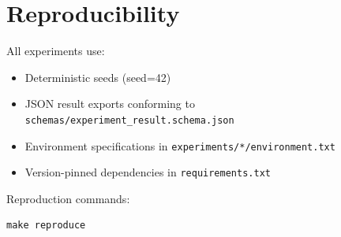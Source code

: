 \section{Reproducibility}
\label{app:reproducibility}


All experiments use:
\begin{itemize}
\item Deterministic seeds (seed=42)
\item JSON result exports conforming to \texttt{schemas/experiment\_result.schema.json}
\item Environment specifications in \texttt{experiments/*/environment.txt}
\item Version-pinned dependencies in \texttt{requirements.txt}
\end{itemize}

Reproduction commands:
\begin{verbatim}
make reproduce
\end{verbatim}
